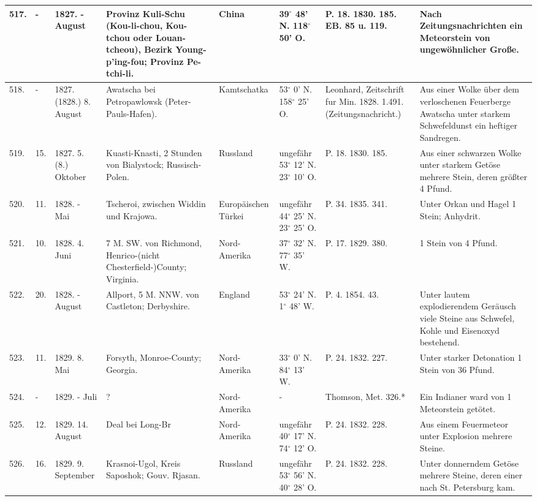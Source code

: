 \documentclass[a4paper, 11pt, oneside, polutonikogreek, german]{article}
\begin{document}
\begin{table}[!ht]
\begin{tabular}{|l|l|l|l|l|l|l|l|}
        517. & - & 1827. - August & Provinz Kuli-Schu (Kou-li-chou, Kou-tchou oder Louan-tcheou), Bezirk Young-p'ing-fou; Provinz Pe-tchi-li. & China & 39$^\circ$ 48' N. 118$^\circ$ 50' O. & P. 18. 1830. 185. EB. 85 u. 119. & Nach Zeitungsnachrichten ein Meteorstein von ungewöhnlicher Große. \\ \hline
        518. & - & 1827. (1828.) 8. August & Awatscha bei Petropawlowsk (Peter-Pauls-Hafen). & Kamtschatka & 53$^\circ$ 0' N. 158$^\circ$ 25' O. & Leonhard, Zeitschrift fur Min. 1828. 1.491. (Zeitungsnachricht.) & Aus einer Wolke über dem verloschenen Feuerberge Awatscha unter starkem Schwefeldunst ein heftiger Sandregen. \\ \hline
        519. & 15. & 1827. 5. (8.) Oktober & Kuasti-Knasti, 2 Stunden von Bialystock; Russisch-Polen. & Russland & ungefähr 53$^\circ$ 12' N. 23$^\circ$ 10' O. & P. 18. 1830. 185. & Aus einer schwarzen Wolke unter starkem Getöse mehrere Stein, deren größter 4 Pfund. \\ \hline
        520. & 11. & 1828. - Mai & Tscheroi, zwischen Widdin und Krajowa. & Europäischen Türkei & ungefähr 44$^\circ$ 25' N. 23$^\circ$ 25' O. & P. 34. 1835. 341. & Unter Orkan und Hagel 1 Stein; Anhydrit. \\ \hline
        521. & 10. & 1828. 4. Juni & 7 M. SW. von Richmond, Henrico-(nicht Chesterfield-)County; Virginia. & Nord-Amerika & 37$^\circ$ 32' N. 77$^\circ$ 35' W. & P. 17. 1829. 380. & 1 Stein von 4 Pfund. \\ \hline
        522. & 20. & 1828. - August & Allport, 5 M. NNW. von Castleton; Derbyshire. & England & 53$^\circ$ 24' N. 1$^\circ$ 48' W. & P. 4. 1854. 43. & Unter lautem explodierendem Geräusch viele Steine aus Schwefel, Kohle und Eisenoxyd bestehend. \\ \hline
        523. & 11. & 1829. 8. Mai & Forsyth, Monroe-County; Georgia. & Nord-Amerika & 33$^\circ$ 0' N. 84$^\circ$ 13' W. & P. 24. 1832. 227. & Unter starker Detonation 1 Stein von 36 Pfund. \\ \hline
        524. & - & 1829. - Juli & ? & Nord-Amerika & - & Thomson, Met. 326.* & Ein Indianer ward von 1 Meteorstein getötet. \\ \hline
        525. & 12. & 1829. 14. August & Deal bei Long-Br & Nord-Amerika & ungefähr 40$^\circ$ 17' N. 74$^\circ$ 12' O. & P. 24. 1832. 228. & Aus einem Feuermeteor unter Explosion mehrere Steine. \\ \hline
        526. & 16. & 1829. 9. September & Krasnoi-Ugol, Kreis Saposhok; Gouv. Rjasan. & Russland & ungefähr 53$^\circ$ 56' N. 40$^\circ$ 28' O. & P. 24. 1832. 228. & Unter donnerndem Getöse mehrere Steine, deren einer nach St. Petersburg kam. \\ \hline

\end{tabular}
\end{table}
\end{document}
